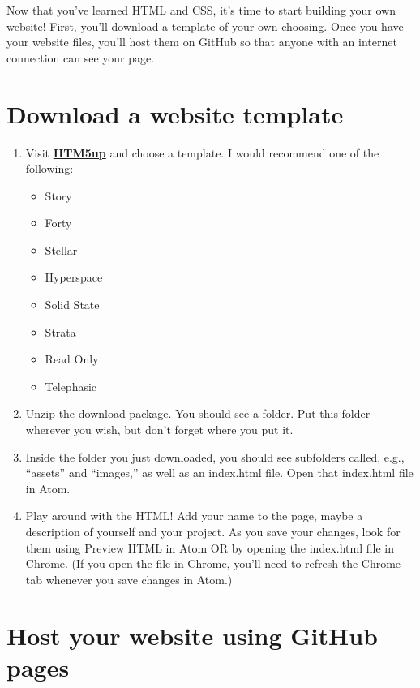 \documentclass[]{book}
\providecommand{\tightlist}{%
  \setlength{\itemsep}{0pt}\setlength{\parskip}{0pt}}
\theoremstyle{definition}
\theoremstyle{definition}
\theoremstyle{definition}
\theoremstyle{remark}
\begin{document}
Now that you've learned HTML and CSS, it's time to start building your
own website! First, you'll download a template of your own choosing.
Once you have your website files, you'll host them on GitHub so that
anyone with an internet connection can see your page.

\hypertarget{download-a-website-template}{%
\section{Download a website
template}\label{download-a-website-template}}

\begin{enumerate}
\def\labelenumi{\arabic{enumi}.}
\tightlist
\item
  Visit \textbf{\href{https://html5up.net/}{HTM5up}} and choose a
  template. I would recommend one of the following:

  \begin{itemize}
  \tightlist
  \item
    Story
  \item
    Forty
  \item
    Stellar
  \item
    Hyperspace
  \item
    Solid State
  \item
    Strata
  \item
    Read Only
  \item
    Telephasic
  \end{itemize}
\item
  Unzip the download package. You should see a folder. Put this folder
  wherever you wish, but don't forget where you put it.
\item
  Inside the folder you just downloaded, you should see subfolders
  called, e.g., ``assets'' and ``images,'' as well as an index.html
  file. Open that index.html file in Atom.
\item
  Play around with the HTML! Add your name to the page, maybe a
  description of yourself and your project. As you save your changes,
  look for them using Preview HTML in Atom OR by opening the index.html
  file in Chrome. (If you open the file in Chrome, you'll need to
  refresh the Chrome tab whenever you save changes in Atom.)
\end{enumerate}

\hypertarget{host-your-website-using-github-pages}{%
\section{Host your website using GitHub
pages}\label{host-your-website-using-github-pages}}
\end{document}
